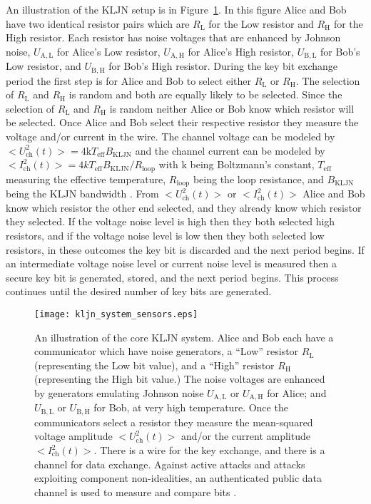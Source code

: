 \documentclass{ws-fnl2}
\begin{document}
An illustration of the KLJN setup is in Figure~\ref{figone}. In this figure Alice and Bob have two identical resistor pairs which are $R_\mathrm{L}$ for the Low resistor and $R_\mathrm{H}$ for the High resistor. Each resistor has noise voltages that are enhanced by Johnson noise, $U_\mathrm{A,L}$ for Alice's Low resistor, $U_\mathrm{A,H}$ for Alice's High resistor, $U_\mathrm{B,L}$ for Bob's Low resistor, and $U_\mathrm{B,H}$ for Bob's High resistor. During the key bit exchange period the first step is for Alice and Bob to select either $R_\mathrm{L}$ or $R_\mathrm{H}$. The selection of $R_\mathrm{L}$ and $R_\mathrm{H}$ is random and both are equally likely to be selected. Since the selection of $R_\mathrm{L}$ and $R_\mathrm{H}$ is random neither Alice or Bob know which resistor will be selected. Once Alice and Bob select their respective resistor they measure the voltage and/or current in the wire. The channel voltage can be modeled by $<U^{2}_\mathrm{ch}(t)>=4\mathrm{k}T_\mathrm{eff}B_\mathrm{KLJN}$ and the channel current can be modeled by $<I^{2}_\mathrm{ch}(t)>=4kT_\mathrm{eff}B_\mathrm{KLJN}/R_\mathrm{loop}$ with k being Boltzmann's constant, $T_\mathrm{eff}$ measuring the effective temperature, $R_\mathrm{loop}$ being the loop resistance, and $B_\mathrm{KLJN}$ being the KLJN bandwidth \cite{kljn1}. From $<U^{2}_\mathrm{ch}(t)>$ or $<I^{2}_\mathrm{ch}(t)>$ Alice and Bob know which resistor the other end selected, and they already know which resistor they selected. If the voltage noise level is high then they both selected high resistors, and if the voltage noise level is low then they both selected low resistors, in these outcomes the key bit is discarded and the next period begins. If an intermediate voltage noise level or current noise level is measured then a secure key bit is generated, stored, and the next period begins. This process continues until the desired number of key bits are generated.



\begin{figure}[ht]
    \label{figone}
  \centering
\texttt{[image: kljn\_system\_sensors.eps]}
    \vspace*{8pt}
    \caption{An illustration of the core KLJN system. Alice and Bob each have a communicator which have noise generators, a ``Low'' resistor $R_\mathrm{L}$ (representing the Low bit value), and a ``High'' resistor $R_\mathrm{H}$ (representing the High bit value.) The noise voltages are enhanced by generators emulating Johnson noise $U_\mathrm{A,L}$ or $U_\mathrm{A,H}$ for Alice; and $U_\mathrm{B,L}$ or $U_\mathrm{B,H}$ for Bob, at very high temperature. Once the communicators select a resistor they measure the mean-squared voltage amplitude $<U^{2}_\mathrm{ch}(t)>$ and/or the current amplitude $<I^{2}_\mathrm{ch}(t)>$. There is a wire for the key exchange, and there is a channel for data exchange. Against active attacks and attacks exploiting component non-idealities, an authenticated public data channel is used to measure and compare bits \cite{lk2, c111}.}
\end{figure}
\end{document}
